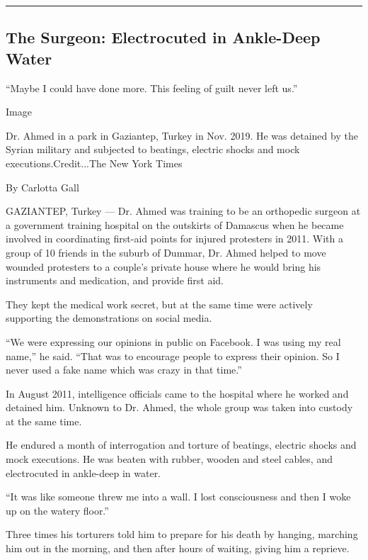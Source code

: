 \begin{center}\rule{0.5\linewidth}{\linethickness}\end{center}

\hypertarget{the-surgeon-electrocuted-in-ankle-deep-water}{%
\subsection{The Surgeon: Electrocuted in Ankle-Deep
Water}\label{the-surgeon-electrocuted-in-ankle-deep-water}}

``Maybe I could have done more. This feeling of guilt never left us.''

Image

Dr. Ahmed in a park in Gaziantep, Turkey in Nov. 2019. He was detained
by the Syrian military and subjected to beatings, electric shocks and
mock executions.Credit...The New York Times

By Carlotta Gall

GAZIANTEP, Turkey --- Dr. Ahmed was training to be an orthopedic surgeon
at a government training hospital on the outskirts of Damascus when he
became involved in coordinating first-aid points for injured protesters
in 2011. With a group of 10 friends in the suburb of Dummar, Dr. Ahmed
helped to move wounded protesters to a couple's private house where he
would bring his instruments and medication, and provide first aid.

They kept the medical work secret, but at the same time were actively
supporting the demonstrations on social media.

``We were expressing our opinions in public on Facebook. I was using my
real name,'' he said. ``That was to encourage people to express their
opinion. So I never used a fake name which was crazy in that time.''

In August 2011, intelligence officials came to the hospital where he
worked and detained him. Unknown to Dr. Ahmed, the whole group was taken
into custody at the same time.

He endured a month of interrogation and torture of beatings, electric
shocks and mock executions. He was beaten with rubber, wooden and steel
cables, and electrocuted in ankle-deep in water.

``It was like someone threw me into a wall. I lost consciousness and
then I woke up on the watery floor.''

Three times his torturers told him to prepare for his death by hanging,
marching him out in the morning, and then after hours of waiting, giving
him a reprieve.

